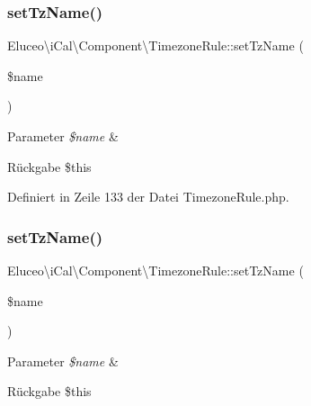 \subsubsection{\texorpdfstring{set\+Tz\+Name()}{setTzName()}\hspace{0.1cm}{\footnotesize\ttfamily [1/3]}}
{\footnotesize\ttfamily Eluceo\textbackslash{}i\+Cal\textbackslash{}\+Component\textbackslash{}\+Timezone\+Rule\+::set\+Tz\+Name (\begin{DoxyParamCaption}\item[{}]{\$name }\end{DoxyParamCaption})}


\begin{DoxyParams}{Parameter}
{\em \$name} & \\
\hline
\end{DoxyParams}
\begin{DoxyReturn}{Rückgabe}
\$this 
\end{DoxyReturn}


Definiert in Zeile 133 der Datei Timezone\+Rule.\+php.

\mbox{\label{class_eluceo_1_1i_cal_1_1_component_1_1_timezone_rule_ac8f0eac95662554ce52e247daf89952a}} 
\subsubsection{\texorpdfstring{set\+Tz\+Name()}{setTzName()}\hspace{0.1cm}{\footnotesize\ttfamily [2/3]}}
{\footnotesize\ttfamily Eluceo\textbackslash{}i\+Cal\textbackslash{}\+Component\textbackslash{}\+Timezone\+Rule\+::set\+Tz\+Name (\begin{DoxyParamCaption}\item[{}]{\$name }\end{DoxyParamCaption})}


\begin{DoxyParams}{Parameter}
{\em \$name} & \\
\hline
\end{DoxyParams}
\begin{DoxyReturn}{Rückgabe}
\$this 
\end{DoxyReturn}


